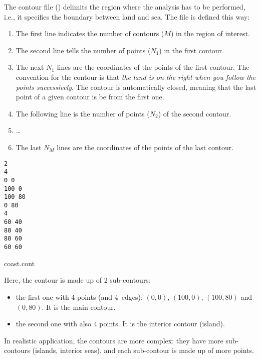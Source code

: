 The contour file () delimits the region where the analysis has to be performed, i.e., it specifies the boundary between land and sea. The file is defined this way:
\begin{enumerate}
\item The first line indicates the number of contours ($M$) in the region of interest.
\item The second line tells the number of points ($N_{1}$) in the first contour.
\item The next $N_1$ lines are the coordinates of the points of the first contour. The convention for the contour is that \textit{the land is on the right when you follow the points successively}. The contour is automatically closed, meaning that the last point of a given contour is be from the first one. 
\item The following line is the number of points ($N_{2}$) of the second contour.
\item \ldots
\item The last $N_M$ lines are the coordinates of the points of the last contour.
\end{enumerate}

\begin{exfile}[htpb]
\begin{footnotesize}
\texttt{2\\
4\\
0 0\\
100 0\\
100 80\\
0 80\\
4\\
60 40\\
80 40\\
80 60\\
60 60} 
\end{footnotesize}
\caption{coast.cont\label{ex:coast.dat}}
\end{exfile}

Here, the contour is made up of 2 sub-contours: 
\begin{itemize}
\item the first one with 4 points (and 4~edges): $(0,0)$, $(100,0)$, $(100,80)$ and $(0,80)$. It is the main contour.
\item the second one with also 4 points. It is the interior contour (island).
\end{itemize}
In realistic application, the contours are more complex: they have more sub-contours (islands, interior seas), and each sub-contour is made up of more points. 

